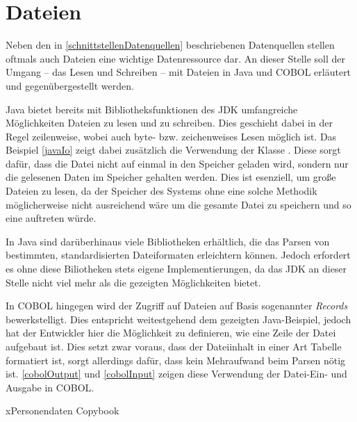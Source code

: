 \section{Dateien}
Neben den in \autoref{schnittstellenDatenquellen} beschriebenen Datenquellen stellen oftmals auch Dateien eine wichtige Datenressource dar. An dieser Stelle soll der Umgang -- das Lesen und Schreiben -- mit Dateien in Java und COBOL erläutert und gegenübergestellt werden.

Java bietet bereits mit Bibliotheksfunktionen des JDK umfangreiche Möglichkeiten Dateien zu lesen und zu schreiben. Dies geschieht dabei in der Regel zeilenweise, wobei auch byte- bzw. zeichenweises Lesen möglich ist. Das Beispiel \autoref{javaIo} zeigt dabei zusätzlich die Verwendung der Klasse . Diese sorgt dafür, dass die Datei nicht auf einmal in den Speicher geladen wird, sondern nur die gelesenen Daten im Speicher gehalten werden. Dies ist esenziell, um große Dateien zu lesen, da der Speicher des Systems ohne eine solche Methodik möglicherweise nicht ausreichend wäre um die gesamte Datei zu speichern und so eine  auftreten würde.


In Java sind darüberhinaus viele Bibliotheken erhältlich, die das Parsen von bestimmten, standardisierten Dateiformaten erleichtern können. Jedoch erfordert es ohne diese Biliotheken stets eigene Implementierungen, da das JDK an dieser Stelle nicht viel mehr als die gezeigten Möglichkeiten bietet.

In COBOL hingegen wird der Zugriff auf Dateien auf Basis sogenannter \textit{Records} bewerkstelligt. Dies entspricht weitestgehend dem gezeigten Java-Beispiel, jedoch hat der Entwickler hier die Möglichkeit zu definieren, wie eine Zeile der Datei aufgebaut ist. Dies setzt zwar voraus, dass der Dateiinhalt in einer Art Tabelle formatiert ist, sorgt allerdings dafür, dass kein Mehraufwand beim Parsen nötig ist. \autoref{cobolOutput} und \autoref{cobolInput} zeigen diese Verwendung der Datei-Ein- und Ausgabe in COBOL.


x{Personendaten Copybook}{}


